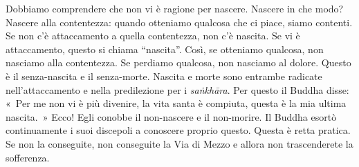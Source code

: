 Dobbiamo comprendere che non vi è ragione per nascere. Nascere in che
modo? Nascere alla contentezza: quando otteniamo qualcosa che ci piace,
siamo contenti. Se non c'è attaccamento a quella contentezza, non c'è
nascita. Se vi è attaccamento, questo si chiama ``nascita''. Così, se
otteniamo qualcosa, non nasciamo alla contentezza. Se perdiamo qualcosa,
non nasciamo al dolore. Questo è il senza-nascita e il senza-morte.
Nascita e morte sono entrambe radicate nell'attaccamento e nella
predilezione per i \emph{saṅkhāra}. Per questo il Buddha disse: «~Per me
non vi è più divenire, la vita santa è compiuta, questa è la mia ultima
nascita.~» Ecco! Egli conobbe il non-nascere e il non-morire. Il Buddha
esortò continuamente i suoi discepoli a conoscere proprio questo. Questa
è retta pratica. Se non la conseguite, non conseguite la Via di Mezzo e
allora non trascenderete la sofferenza.

